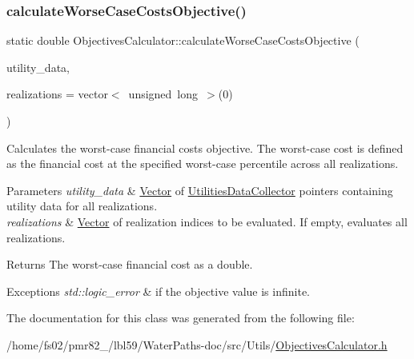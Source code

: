 \subsubsection{\texorpdfstring{calculate\+Worse\+Case\+Costs\+Objective()}{calculateWorseCaseCostsObjective()}}
{\footnotesize\ttfamily static double Objectives\+Calculator\+::calculate\+Worse\+Case\+Costs\+Objective (\begin{DoxyParamCaption}\item[{const vector$<$ \mbox{\hyperlink{classUtilitiesDataCollector}{Utilities\+Data\+Collector}} $\ast$$>$ \&}]{utility\+\_\+data,  }\item[{vector$<$ unsigned long $>$}]{realizations = {\ttfamily vector$<$~unsigned~long~$>$(0)} }\end{DoxyParamCaption})\hspace{0.3cm}{\ttfamily [static]}}



Calculates the worst-\/case financial costs objective. The worst-\/case cost is defined as the financial cost at the specified worst-\/case percentile across all realizations. 


\begin{DoxyParams}{Parameters}
{\em utility\+\_\+data} & \mbox{\hyperlink{classVector}{Vector}} of {\ttfamily \mbox{\hyperlink{classUtilitiesDataCollector}{Utilities\+Data\+Collector}}} pointers containing utility data for all realizations. \\
\hline
{\em realizations} & \mbox{\hyperlink{classVector}{Vector}} of realization indices to be evaluated. If empty, evaluates all realizations.\\
\hline
\end{DoxyParams}
\begin{DoxyReturn}{Returns}
The worst-\/case financial cost as a double.
\end{DoxyReturn}

\begin{DoxyExceptions}{Exceptions}
{\em std\+::logic\+\_\+error} & if the objective value is infinite. \\
\hline
\end{DoxyExceptions}


The documentation for this class was generated from the following file\+:\begin{DoxyCompactItemize}
\item 
/home/fs02/pmr82\+\_/lbl59/\+Water\+Paths-\/doc/src/\+Utils/\mbox{\hyperlink{ObjectivesCalculator_8h}{Objectives\+Calculator.\+h}}\end{DoxyCompactItemize}
